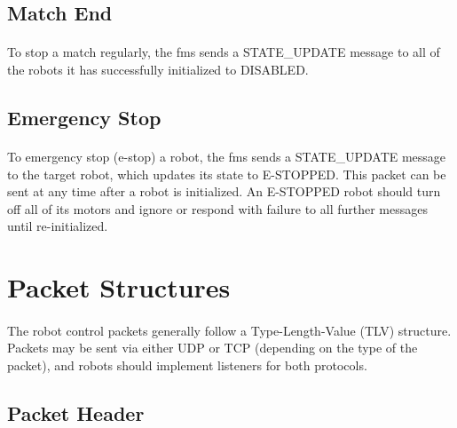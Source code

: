 \documentclass[11pt]{article}
\begin{document}
\subsection {Match End}
\paragraph{}
To stop a match regularly, the \acrshort{fms} sends a STATE\_UPDATE message to 
all of the robots it has successfully initialized to DISABLED.

\subsection{Emergency Stop}
\paragraph{}
To emergency stop (e-stop) a robot, the \acrshort{fms} sends a STATE\_UPDATE message to the target robot, which updates its state to E-STOPPED.
This packet can be sent at any time after a robot is initialized. An E-STOPPED robot should turn off all of its motors 
and ignore or respond with failure to all further messages until re-initialized.

\section {Packet Structures}
\paragraph{}
The robot control packets generally follow a Type-Length-Value (TLV) structure. Packets may be sent via either UDP or TCP (depending on the type of the packet), and robots should implement listeners for both protocols.

\subsection {Packet Header}
\end{document}
